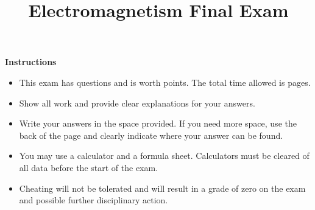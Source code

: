 \documentclass[12pt]{exam}
\title{Electromagnetism Final Exam}
\author{}
\date{}
\begin{document}
\maketitle

\begin{center}
\textbf{Instructions}
\end{center}
\begin{itemize}[label=$\bullet$,leftmargin=*]
    \item This exam has \numquestions{} questions and is worth \numpoints{} points. The total time allowed is \numpages{} pages.
    \item Show all work and provide clear explanations for your answers.
    \item Write your answers in the space provided. If you need more space, use the back of the page and clearly indicate where your answer can be found.
    \item You may use a calculator and a formula sheet. Calculators must be cleared of all data before the start of the exam.
    \item Cheating will not be tolerated and will result in a grade of zero on the exam and possible further disciplinary action.
\end{itemize}
\end{document}
